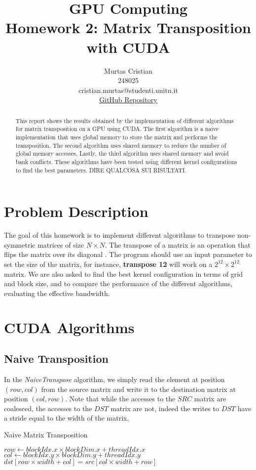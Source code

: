 \documentclass[]{IEEEconf}
\title{\textbf{GPU Computing} \\
    \large Homework 2: Matrix Transposition with CUDA\\
}
\author{Murtas Cristian \\ 248025 \\ cristian.murtas@studenti.unitn.it \\
\underline{\href{https://github.com/SecondarySkyler/gpu-computing/tree/main/matrix_transposition}{GitHub Repository}}
}
\begin{document}
\maketitle
\nocite{*}

\begin{abstract}
This report shows the results obtained by the implementation of different algorithms for matrix transposition
on a GPU using CUDA. The first algorithm is a naive implementation that uses global memory to store the matrix
and performs the transposition. The second algorithm uses shared memory to reduce the number of global memory accesses.
Lastly, the third algorithm uses shared memory and avoid bank conflicts. These algorithms have been tested using different
kernel configurations to find the best parameters. DIRE QUALCOSA SUI RISULTATI.
\end{abstract}
\section{Problem Description}
The goal of this homework is to implement different algorithms to transpose non-symmetric matrices of size $N \times N$.
The transpose of a matrix is an operation that flips the matrix over its diagonal \cite{wiki:transposition}.
The program should use an input parameter to set the size of the matrix, for instance, \textbf{transpose 12} will work on a 
$2^{12} \times 2^{12}$ matrix. 
We are also asked to find the best kernel configuration in terms of grid and block size, and to compare the performance 
of the different algorithms, evaluating the effective bandwidth.
\section{CUDA Algorithms}
\subsection{Naive Transposition}
In the \textit{NaiveTranspose} algorithm, we simply read the element at position $(row, col)$ from the source matrix and write it to the destination matrix at position $(col, row)$.
Note that while the accesses to the $SRC$ matrix are coalesced, the accesses to the $DST$ matrix are not, indeed the writes to $DST$ have a stride equal
to the width of the matrix.
\begin{algorithm}
    \caption{Naive Matrix Transposition}
    \begin{algorithmic}[1]
            \State $row \gets blockIdx.x \times blockDim.x + threadIdx.x$
            \State $col \gets blockIdx.y \times blockDim.y + threadIdx.y$
                \State $dst[row \times width + col] = src[col \times width + row]$
            \EndIf
        \EndProcedure
    \end{algorithmic}
\end{algorithm}
\end{document}
